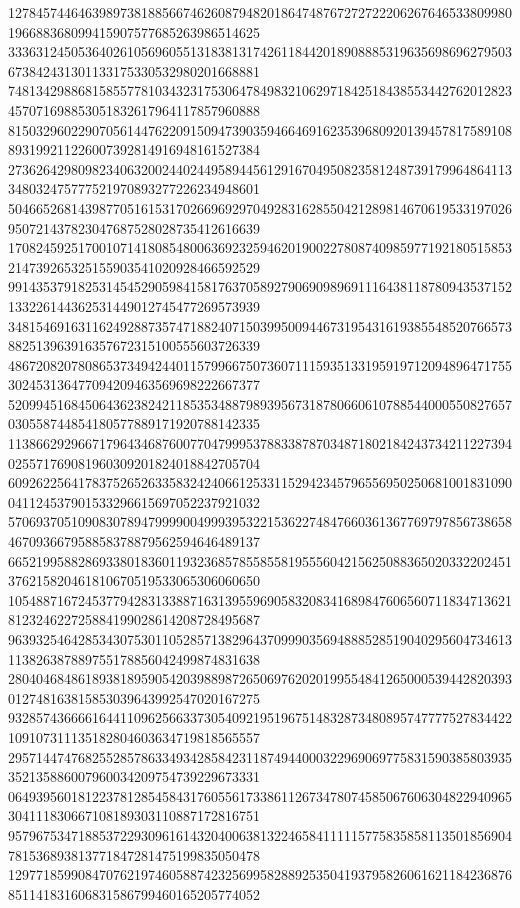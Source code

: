 \begin{DoxyCode}
      127845744646398973818856674626087948201864748767272722206267646533809980196688368099415907577685263986514625
      333631245053640261056960551318381317426118442018908885319635698696279503673842431301133175330532980201668881
      748134298868158557781034323175306478498321062971842518438553442762012823457071698853051832617964117857960888
      815032960229070561447622091509473903594664691623539680920139457817589108893199211226007392814916948161527384
      273626429809823406320024402449589445612916704950823581248739179964864113348032475777521970893277226234948601
      504665268143987705161531702669692970492831628550421289814670619533197026950721437823047687528028735412616639
      170824592517001071418085480063692325946201900227808740985977192180515853214739265325155903541020928466592529
      991435379182531454529059841581763705892790690989691116438118780943537152133226144362531449012745477269573939
      348154691631162492887357471882407150399500944673195431619385548520766573882513963916357672315100555603726339
      486720820780865373494244011579966750736071115935133195919712094896471755302453136477094209463569698222667377
      520994516845064362382421185353488798939567318780660610788544000550827657030558744854180577889171920788142335
      113866292966717964346876007704799953788338787034871802184243734211227394025571769081960309201824018842705704
      609262256417837526526335832424066125331152942345796556950250681001831090041124537901533296615697052237921032
      570693705109083078947999900499939532215362274847660361367769797856738658467093667958858378879562594646489137
      665219958828693380183601193236857855855819555604215625088365020332202451376215820461810670519533065306060650
      105488716724537794283133887163139559690583208341689847606560711834713621812324622725884199028614208728495687
      963932546428534307530110528571382964370999035694888528519040295604734613113826387889755178856042499874831638
      280404684861893818959054203988987265069762020199554841265000539442820393012748163815853039643992547020167275
      932857436666164411096256633730540921951967514832873480895747777527834422109107311135182804603634719818565557
      295714474768255285786334934285842311874944000322969069775831590385803935352135886007960034209754739229673331
      064939560181223781285458431760556173386112673478074585067606304822940965304111830667108189303110887172816751
      957967534718853722930961614320400638132246584111115775835858113501856904781536893813771847281475199835050478
      129771859908470762197460588742325699582889253504193795826061621184236876851141831606831586799460165205774052

\end{DoxyCode}
